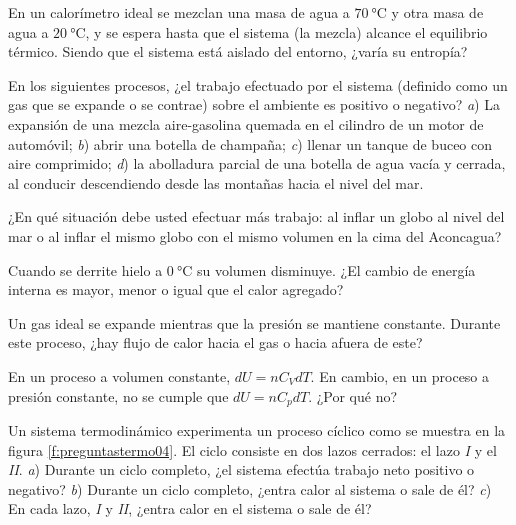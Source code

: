 %
\begin{Exercise}
  En un calorímetro ideal se mezclan una masa de agua a $\SI{70}{\celsius}$ y otra masa de agua a $\SI{20}{\celsius}$, y se espera hasta que el sistema (la mezcla) alcance el equilibrio térmico. Siendo que el sistema está aislado del entorno, ¿varía su entropía?
\end{Exercise}
%
\begin{Exercise}
  En los siguientes procesos, ¿el trabajo efectuado por el sistema (definido como un gas que se expande o se contrae) sobre el ambiente es positivo o negativo? \textit{a}) La expansión de una mezcla aire-gasolina quemada en el cilindro de un motor de automóvil; \textit{b}) abrir una botella de champaña; \textit{c}) llenar un tanque de buceo con aire comprimido; \textit{d}) la abolladura parcial de una botella de agua vacía y cerrada, al conducir descendiendo desde las montañas hacia el nivel del mar.
\end{Exercise}
%
\begin{Exercise}
  ¿En qué situación debe usted efectuar más trabajo: al inflar un globo al nivel del mar o al inflar el mismo globo con el mismo volumen en la cima del Aconcagua?
\end{Exercise}
%
\begin{Exercise}
  Cuando se derrite hielo a $\SI{0}{\celsius}$ su volumen disminuye. ¿El cambio de energía interna es mayor, menor o igual que el calor agregado?
\end{Exercise}
%
\begin{Exercise}
  Un gas ideal se expande mientras que la presión se mantiene constante. Durante este proceso, ¿hay flujo de calor hacia el gas o hacia afuera de este?
\end{Exercise}
%
\begin{Exercise}
  En un proceso a volumen constante, $dU = nC_VdT$. En cambio, en un proceso a presión constante, no se cumple que $dU = nC_pdT$. ¿Por qué no?
\end{Exercise}
%
\begin{Exercise}\label{p:preguntastermo04}
  Un sistema termodinámico experimenta un proceso cíclico como se muestra en la figura \ref{f:preguntastermo04}. El ciclo consiste en dos lazos cerrados: el lazo \textit{I} y el \textit{II}. \textit{a}) Durante un ciclo completo, ¿el sistema efectúa trabajo neto positivo o negativo? \textit{b}) Durante un ciclo completo, ¿entra calor al sistema o sale de él? \textit{c}) En cada lazo, \textit{I} y \textit{II}, ¿entra calor en el sistema o sale de él?
\end{Exercise}
